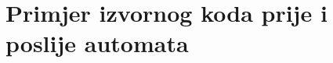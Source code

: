 \appendix
\renewcommand{\thechapter}{B}
\chapter{Primjer izvornog koda prije i poslije automata}
\label{before:after}

\begin{multicols}{2}

	
	
	
	
\end{multicols}